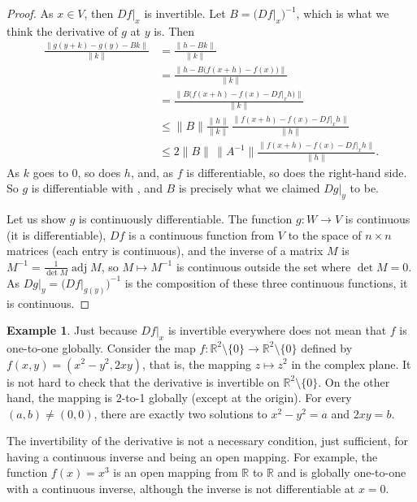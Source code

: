 \documentclass[12pt,openany]{book}
\newcommand{\snorm}[1]{\lVert {#1} \rVert}
\newcommand{\R}{{\mathbb{R}}}
\theoremstyle{plain}
\theoremstyle{remark}
\theoremstyle{definition}
\theoremstyle{exercise}
\theoremstyle{example}
\newtheorem{example}[thm]{Example}
\begin{document}
\begin{proof}
As $x \in V$, then $Df|_x$ is invertible.
Let $B = \bigl(Df|_x\bigr)^{-1}$, which is what we think the derivative of
$g$ at $y$ is.  Then
\begin{equation*}
\begin{split}
\frac{\snorm{g(y+k)-g(y)-Bk}}{\snorm{k}}
& =
\frac{\snorm{h-Bk}}{\snorm{k}}
\\
& =
\frac{\snorm{h-B\bigl(f(x+h)-f(x)\bigr)}}{\snorm{k}}
\\
& =
\frac{\snorm{B\bigl(f(x+h)-f(x)-Df|_x h\bigr)}}{\snorm{k}}
\\
& \leq
\snorm{B}
\frac{\snorm{h}}{\snorm{k}}\,
\frac{\snorm{f(x+h)-f(x)-Df|_x h}}{\snorm{h}}
\\
& \leq
2\snorm{B} \, \snorm{A^{-1}}
\frac{\snorm{f(x+h)-f(x)-Df|_x h}}{\snorm{h}} .
\end{split}
\end{equation*}
As $k$ goes to $0$, so does $h$, and, as $f$ is differentiable, so does the right-hand side.
So $g$ is differentiable with , and $B$
is precisely what we claimed $Dg|_y$ to be.

Let us show $g$ is continuously
differentiable.
The function $g \colon W \to V$ is continuous (it is differentiable),
$Df$ is a continuous function from $V$
to the space of $n \times n$ matrices (each entry is continuous),
and the inverse of a matrix $M$ is $M^{-1} = \frac{1}{\det M} \operatorname{adj} M$,
so $M \mapsto M^{-1}$ is continuous outside the set where $\det M = 0$.
As
$Dg|_y = {\bigl( Df|_{g(y)}\bigr)}^{-1}$ is the composition
of these three
continuous functions, it is continuous.
\end{proof}

\begin{example}
Just because $Df|_x$ is invertible everywhere does not
mean that $f$ is
one-to-one globally.  Consider
the map $f \colon \R^2 \setminus \{ 0 \} \to \R^2 \setminus \{
0 \}$ defined
by $f(x,y) = (x^2-y^2,2xy)$,  that is, the mapping $z \mapsto z^2$ in the
complex plane.  It is not hard to check that
the derivative is invertible on $\R^2 \setminus \{ 0 \}$.
On the other hand, the mapping is 2-to-1 globally (except at the origin).
For every $(a,b) \not= (0,0)$, there are exactly two
solutions to $x^2-y^2=a$ and $2xy=b$.
\end{example}

The invertibility of the derivative is not a necessary
condition, just sufficient, for having a continuous inverse and being an open
mapping.  For example, the function $f(x) = x^3$ is an open mapping from $\R$
to $\R$ and is globally one-to-one with a continuous inverse, although the
inverse is not differentiable at $x=0$.
\end{document}
